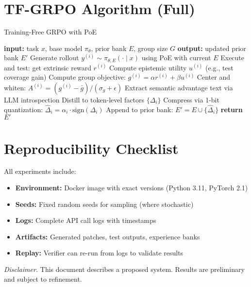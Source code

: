 \documentclass[11pt]{article}
\begin{document}
\appendix
\section{TF-GRPO Algorithm (Full)}
\begin{algorithm}[H]
\caption{Training-Free GRPO with PoE}
\begin{algorithmic}[1]
\State \textbf{input:} task \(x\), base model \(\pi_\theta\), prior bank \(E\), group size \(G\)
\State \textbf{output:} updated prior bank \(E'\)
  \State Generate rollout \(y^{(i)} \sim \pi_{\theta,E}(\cdot \mid x)\) using PoE with current \(E\)
  \State Execute and test: get extrinsic reward \(r^{(i)}\)
  \State Compute epistemic utility \(u^{(i)}\) (e.g., test coverage gain)
\EndFor
\State Compute group objective: \(g^{(i)} = \alpha r^{(i)} + \beta u^{(i)}\)
\State Center and whiten: \(A^{(i)} = (g^{(i)} - \bar g) / (\sigma_g + \epsilon)\)
\State Extract semantic advantage text via LLM introspection
\State Distill to token-level factors \(\{\Delta_i\}\)
\State Compress via 1-bit quantization: \(\widehat{\Delta}_i = \alpha_i \cdot \text{sign}(\Delta_i)\)
\State Append to prior bank: \(E' = E \cup \{\widehat{\Delta}_i\}\)
\State \textbf{return} \(E'\)
\end{algorithmic}
\end{algorithm}

\section{Reproducibility Checklist}
All experiments include:
\begin{itemize}[leftmargin=1.1em]
  \item \textbf{Environment:} Docker image with exact versions (Python 3.11, PyTorch 2.1)
  \item \textbf{Seeds:} Fixed random seeds for sampling (where stochastic)
  \item \textbf{Logs:} Complete API call logs with timestamps
  \item \textbf{Artifacts:} Generated patches, test outputs, experience banks
  \item \textbf{Replay:} Verifier can re-run from logs to validate results
\end{itemize}

\vspace{1em}
\noindent\textit{Disclaimer.} This document describes a proposed system. Results are preliminary and subject to refinement.
\end{document}
